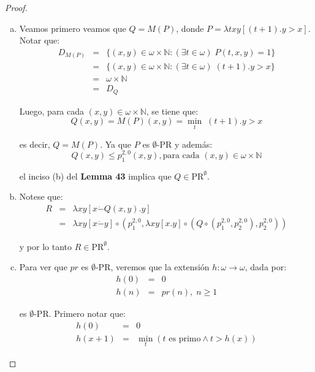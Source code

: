   \begin{proof}
    \begin{enumerate}[a)]
      \item Veamos primero veamos que $Q=M(P)$, donde $P=\lambda txy\left[(t+1).y > x\right]$. Notar que:
        \begin{eqnarray}
          \nonumber D_{M(P)} &=& \{(x,y) \in \omega \times \mathbb{N}: (\exists t \in \omega) \; P(t,x,y) = 1\} \\
          \nonumber &=& \{(x,y) \in \omega \times \mathbb{N}: (\exists t \in \omega) \; (t+1).y > x \} \\
          \nonumber &=& \omega \times \mathbb{N} \\
          \nonumber &=& D_{Q}
        \end{eqnarray}

        \PN Luego, para cada $(x,y) \in \omega \times \mathbb{N}$, se tiene que:
        \[
          Q(x,y) = M(P)(x,y) = \min_{t} \; (t+1).y > x
        \]

        \PN es decir, $Q = M(P)$. Ya que $P$ es $\emptyset$-PR y además:
        \[
          Q(x,y) \leq p_{1}^{2,0}(x,y), \text{para cada }(x,y) \in \omega \times \mathbb{N}
        \]

        \PN el inciso (b) del \textbf{Lemma 43} implica que $Q \in \mathrm{PR}^{\emptyset}$.
      \item Notese que:
        \begin{eqnarray*}
          R &=& \lambda xy\left[x \dot{-}Q(x,y).y\right] \\
          &=& \lambda xy \left[x \dot{-}y\right] \circ (p_{1}^{2,0}, \lambda xy \left[x.y\right] \circ (Q
            \circ (p_{1}^{2,0}, p_{2}^{2,0}), p_{2}^{2,0}))
        \end{eqnarray*}

        \PN y por lo tanto $R \in \mathrm{PR}^{\emptyset}$.
      \item Para ver que $pr$ es $\emptyset$-PR, veremos que la extensión $h: \omega \rightarrow \omega$, dada por:
        \begin{eqnarray*}
          h(0) &=& 0 \\
          h(n) &=& pr(n), \; n \geq 1
        \end{eqnarray*}

        \PN es $\emptyset$-PR. Primero notar que:
        \begin{eqnarray*}
          h(0) &=& 0 \\
          h(x+1) &=& \min_{t}\left(t \text{ es primo} \wedge t > h(x)\right)
        \end{eqnarray*}


\end{enumerate}
\end{proof}
